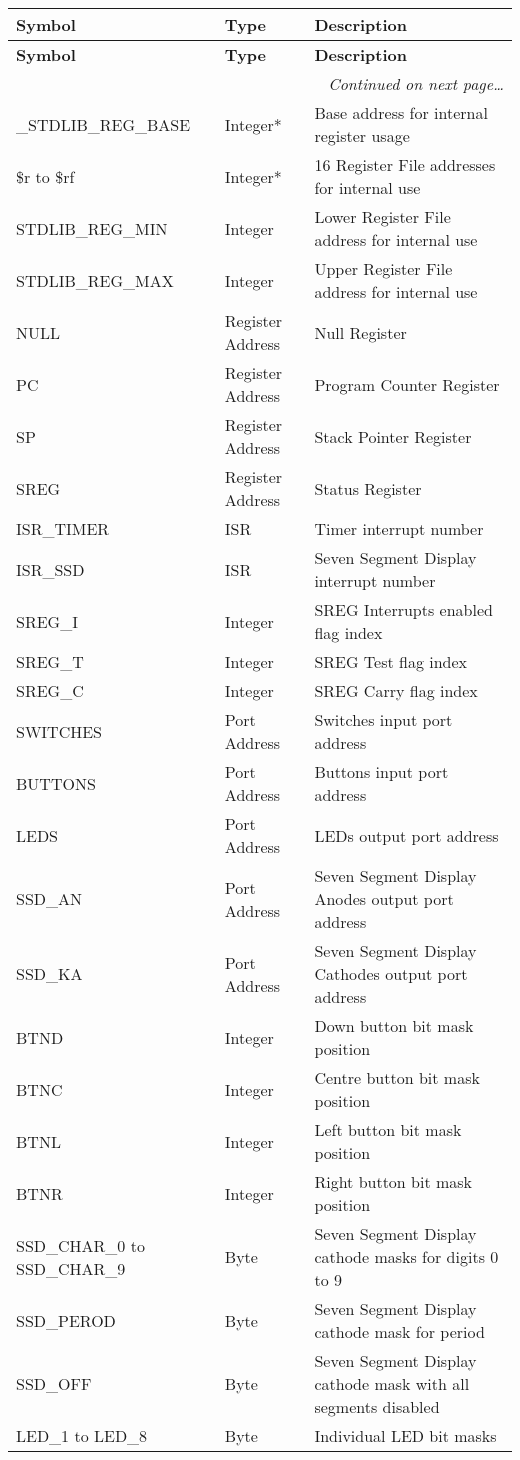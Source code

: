 \documentclass[12pt,twoside]{report}
\begin{document}
{\scriptsize
\begin{longtable}{ | l | l | l | }
  \hline
  \textbf{Symbol} & \textbf{Type} & \textbf{Description} \\
  \hline
\endfirsthead
  \hline
  \textbf{Symbol} & \textbf{Type} & \textbf{Description} \\
  \hline

\endhead
  \hline
  \multicolumn{3}{r}{\emph{Continued on next page\ldots}}
\endfoot

\endlastfoot
 \hline
 \_STDLIB\_USER\_ENTRY\_POINT & Label* & User code entry point \\
 \_STDLIB\_REG\_BASE & Integer* & Base address for internal register usage \\
 \$r to \$rf & Integer* & 16 Register File addresses for internal use \\
 STDLIB\_REG\_MIN & Integer & Lower Register File address for internal use \\
 STDLIB\_REG\_MAX & Integer & Upper Register File address for internal use \\
 NULL & Register Address & Null Register \\
 PC & Register Address & Program Counter Register \\
 SP & Register Address & Stack Pointer Register \\
 SREG & Register Address & Status Register \\
 ISR\_TIMER & ISR & Timer interrupt number \\
 ISR\_SSD & ISR & Seven Segment Display interrupt number \\
 SREG\_I & Integer & SREG Interrupts enabled flag index \\
 SREG\_T & Integer & SREG Test flag index \\
 SREG\_C & Integer & SREG Carry flag index \\
 SWITCHES & Port Address & Switches input port address \\
 BUTTONS & Port Address & Buttons input port address \\
 LEDS & Port Address & LEDs output port address \\
 SSD\_AN & Port Address & Seven Segment Display Anodes output port address \\
 SSD\_KA & Port Address & Seven Segment Display Cathodes output port address \\
 BTND & Integer & Down button bit mask position \\
 BTNC & Integer & Centre button bit mask position \\
 BTNL & Integer & Left button bit mask position \\
 BTNR & Integer & Right button bit mask position \\
 SSD\_CHAR\_0 to SSD\_CHAR\_9 & Byte & Seven Segment Display cathode masks for digits 0 to 9 \\
 SSD\_PEROD & Byte & Seven Segment Display cathode mask for period \\
 SSD\_OFF & Byte & Seven Segment Display cathode mask with all segments disabled \\
 LED\_1 to LED\_8 & Byte & Individual LED bit masks \\
 \hline
\end{longtable}}
\end{document}
